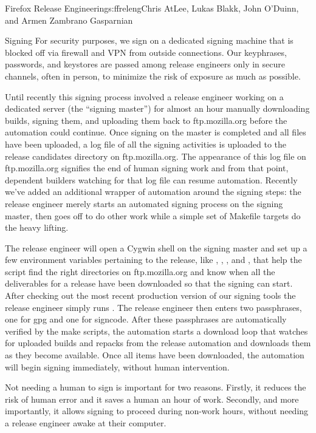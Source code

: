 \begin{aosachapter}{Firefox Release Engineering}{s:ffreleng}{Chris AtLee, Lukas Blakk, John O'Duinn, and Armen Zambrano Gasparnian}
\begin{aosasect1}{Signing}
For security purposes, we sign on a dedicated signing machine that is
blocked off via firewall and VPN from outside connections. Our
keyphrases, passwords, and keystores are passed among release
engineers only in secure channels, often in person, to minimize the
risk of exposure as much as possible.


Until recently this signing process involved a release engineer
working on a dedicated server (the ``signing master'') for almost an
hour manually downloading builds, signing them, and
uploading them back to ftp.mozilla.org before the automation could
continue.  Once signing on the master is completed and all files have
been uploaded, a log file of all the signing activities is uploaded to
the release candidates directory on ftp.mozilla.org.  The appearance
of this log file on ftp.mozilla.org signifies the end of human signing
work and from that point, dependent builders watching for that log
file can resume automation.  Recently we've added an additional
wrapper of automation around the signing steps: the release engineer
merely starts an automated signing process on the signing master, then
goes off to do other work while a simple set of Makefile targets do
the heavy lifting.

The release engineer will open a Cygwin shell on the signing master
and set up a few environment variables pertaining to the release, like
, , , and , that
help the script find the right directories on ftp.mozilla.org and know
when all the deliverables for a release have been downloaded so that
the signing can start. After checking out the most recent production
version of our signing tools the release engineer simply runs
. The release engineer then enters two
passphrases, one for gpg and one for signcode. After these passphrases
are automatically verified by the make scripts, the automation
starts a download loop that watches for uploaded builds and repacks
from the release automation and downloads them as they become
available.  Once all items have been downloaded, the automation will
begin signing immediately, without human intervention. 

Not needing a
human to sign is important for two reasons. Firstly, it reduces the
risk of human error and it saves a human an
hour of work. Secondly, and more importantly, it allows signing to
proceed during non-work hours, without needing a release engineer
awake at their computer.  


\end{aosasect1}
\end{aosachapter}
